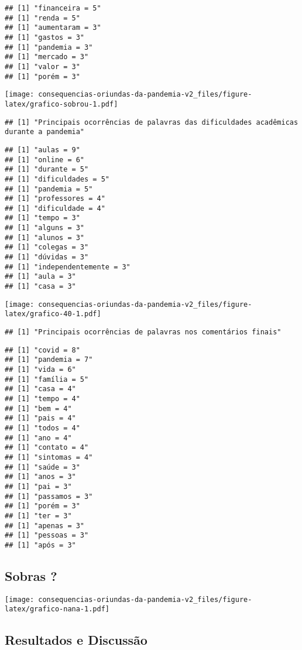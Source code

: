 \documentclass[
]{article}
\begin{document}
\begin{verbatim}
## [1] "financeira = 5"
## [1] "renda = 5"
## [1] "aumentaram = 3"
## [1] "gastos = 3"
## [1] "pandemia = 3"
## [1] "mercado = 3"
## [1] "valor = 3"
## [1] "porém = 3"
\end{verbatim}

\texttt{[image: consequencias-oriundas-da-pandemia-v2\_files/figure-latex/grafico-sobrou-1.pdf]}

\begin{verbatim}
## [1] "Principais ocorrências de palavras das dificuldades acadêmicas durante a pandemia"
\end{verbatim}

\begin{verbatim}
## [1] "aulas = 9"
## [1] "online = 6"
## [1] "durante = 5"
## [1] "dificuldades = 5"
## [1] "pandemia = 5"
## [1] "professores = 4"
## [1] "dificuldade = 4"
## [1] "tempo = 3"
## [1] "alguns = 3"
## [1] "alunos = 3"
## [1] "colegas = 3"
## [1] "dúvidas = 3"
## [1] "independentemente = 3"
## [1] "aula = 3"
## [1] "casa = 3"
\end{verbatim}

\texttt{[image: consequencias-oriundas-da-pandemia-v2\_files/figure-latex/grafico-40-1.pdf]}

\begin{verbatim}
## [1] "Principais ocorrências de palavras nos comentários finais"
\end{verbatim}

\begin{verbatim}
## [1] "covid = 8"
## [1] "pandemia = 7"
## [1] "vida = 6"
## [1] "família = 5"
## [1] "casa = 4"
## [1] "tempo = 4"
## [1] "bem = 4"
## [1] "pais = 4"
## [1] "todos = 4"
## [1] "ano = 4"
## [1] "contato = 4"
## [1] "sintomas = 4"
## [1] "saúde = 3"
## [1] "anos = 3"
## [1] "pai = 3"
## [1] "passamos = 3"
## [1] "porém = 3"
## [1] "ter = 3"
## [1] "apenas = 3"
## [1] "pessoas = 3"
## [1] "após = 3"
\end{verbatim}

\hypertarget{sobras}{%
\subsection{Sobras ?}\label{sobras}}

\texttt{[image: consequencias-oriundas-da-pandemia-v2\_files/figure-latex/grafico-nana-1.pdf]}

\hypertarget{resultados-e-discussuxe3o}{%
\subsection{Resultados e Discussão}\label{resultados-e-discussuxe3o}}
\end{document}
